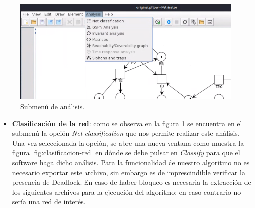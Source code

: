 \begin{itemize}
    \begin{figure} [H]
        \centering
        \includegraphics[scale=0.7]{Figures/petrinator/analisis.png}
        \caption{Submenú de análisis.}
        \label{fig:open-analysis}
    \end{figure}
    
    \begin{itemize}
        \item \textbf{Clasificación de la red}: como se observa en la figura \ref{fig:open-analysis} se encuentra en el submenú la opción \textit{Net classification} que nos permite realizar este análisis.
        Una vez seleccionada la opción, se abre una nueva ventana como muestra la figura \ref{fig:clasificacion-red} en dónde se debe pulsar en \textit{Classify} para que el software haga dicho análisis. Para la funcionalidad de nuestro algoritmo no es necesario exportar este archivo, sin embargo es de imprescindible verificar la presencia de Deadlock. En caso de haber bloqueo es necesaria la extracción de los siguientes archivos para la ejecución del algoritmo; en caso contrario no sería una red de interés.
        

\end{itemize}
\end{itemize}
